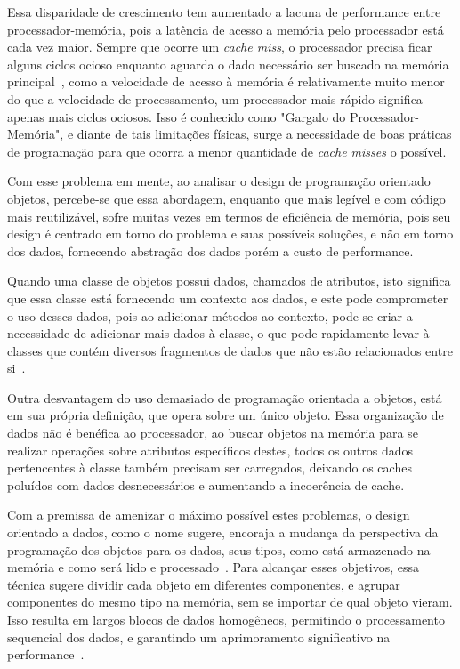 \documentclass[11pt]{article}
\begin{document}
Essa disparidade de crescimento tem aumentado a lacuna de performance entre processador-memória, pois 
a latência de acesso a memória pelo processador está cada vez maior. Sempre que ocorre um \textit{cache miss}, o processador 
precisa ficar alguns ciclos ocioso enquanto aguarda o dado necessário ser buscado na memória 
principal~\cite{Mahapatra:1999:PBP:357783.331677}, como a velocidade de 
acesso à memória é relativamente muito menor do que a velocidade de processamento, um processador mais rápido significa apenas 
mais ciclos ociosos. Isso é conhecido como "Gargalo do Processador-Memória", e diante de tais limitações físicas, surge a 
necessidade de boas práticas de programação para que ocorra a menor quantidade de \textit{cache misses} o possível.

Com esse problema em mente, ao analisar o design de programação orientado objetos, percebe-se que essa abordagem, enquanto que 
mais legível e com código mais reutilizável, sofre muitas vezes em termos de eficiência de memória, pois seu design é centrado 
em torno do problema e suas possíveis soluções, e não em torno dos dados, fornecendo abstração dos dados porém a 
custo de performance.

Quando uma classe de objetos possui dados, chamados de atributos, isto significa que essa classe está fornecendo um contexto 
aos dados, e este pode comprometer o uso desses dados, pois ao adicionar métodos ao contexto, pode-se criar a necessidade 
de adicionar mais dados à classe, o que pode rapidamente levar à classes que contém diversos fragmentos de dados que não 
estão relacionados entre si~\cite{fabiandod}.

Outra desvantagem do uso demasiado de programação orientada a objetos, está em sua própria definição, que opera sobre um único 
objeto. Essa organização de dados não é benéfica ao processador, ao buscar objetos na memória para se realizar operações sobre 
atributos específicos destes, todos os outros dados pertencentes à classe também precisam ser carregados, deixando os caches 
poluídos com dados desnecessários e aumentando a incoerência de cache.

Com a premissa de amenizar o máximo possível estes problemas, o design orientado a dados, como o nome sugere, encoraja a 
mudança da perspectiva da programação dos objetos para os dados, seus tipos, como está armazenado na memória e como será lido 
e processado~\cite{fabiandod}. Para alcançar esses objetivos, essa técnica sugere dividir cada objeto em diferentes 
componentes, e agrupar componentes do mesmo tipo na memória, sem se importar de qual objeto vieram. Isso resulta em largos 
blocos de dados homogêneos, permitindo o processamento sequencial dos dados, e garantindo um aprimoramento significativo 
na performance~\cite{fabiandod}.
\end{document}
